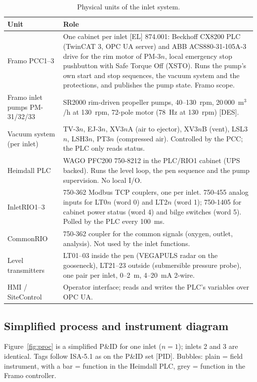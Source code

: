 \documentclass[11pt,a4paper]{article}
\begin{document}
\begin{table}[htbp]
\centering\small
\caption{Physical units of the inlet system.}
\label{tab:units}
\begin{tabularx}{\textwidth}{@{}P{34mm}L@{}}
\toprule
Unit & Role \\
\midrule
Framo PCC1--3 & One cabinet per inlet [EL] 874.001: Beckhoff CX8200 PLC (TwinCAT 3, OPC UA server) and
  ABB ACS880-31-105A-3 drive for the rim motor of PM-3$n$, local emergency stop pushbutton with Safe
  Torque Off (XSTO). Runs the pump's own start and stop sequences, the vacuum system and the
  protections, and publishes the pump state. Framo scope. \\
Framo inlet pumps PM-31/32/33 & SR2000 rim-driven propeller pumps, 40--130~rpm, 20\,000~m$^3$/h at
  130~rpm, 72-pole motor (78~Hz at 130~rpm) [DES]. \\
Vacuum system (per inlet) & TV-3$n$, EJ-3$n$, XV3$n$A (air to ejector), XV3$n$B (vent), LSL3$n$, LSH3$n$, PT3$n$
  (compressed air). Controlled by the PCC; the PLC only reads status. \\
Heimdall PLC & WAGO PFC200 750-8212 in the PLC/RIO1 cabinet (UPS backed). Runs the level loop, the
  pen sequence and the pump supervision. No local I/O. \\
InletRIO1--3 & 750-362 Modbus TCP couplers, one per inlet. 750-455 analog inputs for LT0$n$ (word 0)
  and LT2$n$ (word 1); 750-1405 for cabinet power status (word 4) and bilge switches (word 5). Polled by
  the PLC every 100~ms. \\
CommonRIO & 750-362 coupler for the common signals (oxygen, outlet, analysis). Not used by the inlet
  functions. \\
Level transmitters & LT01--03 inside the pen (VEGAPULS radar on the gooseneck), LT21--23 outside
  (submersible pressure probe), one pair per inlet, 0--2~m, 4--20~mA 2-wire. \\
HMI / SiteControl & Operator interface; reads and writes the PLC's variables over OPC UA. \\
\bottomrule
\end{tabularx}
\end{table}

\subsection{Simplified process and instrument diagram}
Figure~\ref{fig:proc} is a simplified P\&ID for one inlet ($n = 1$); inlets 2 and 3 are identical.
Tags follow ISA-5.1 as on the P\&ID set [PID]. Bubbles: plain = field instrument, with a bar = function
in the Heimdall PLC, grey = function in the Framo controller.
\end{document}
